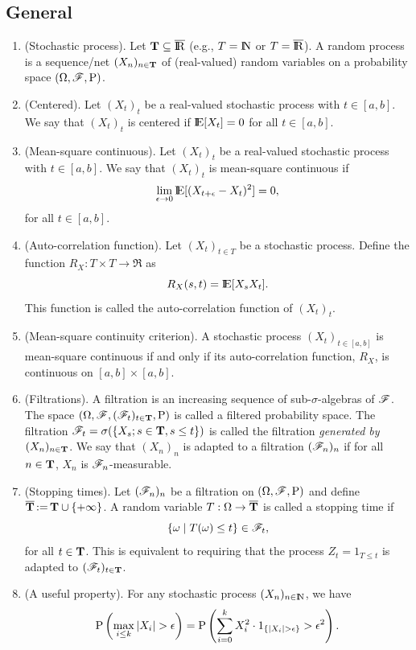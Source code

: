 \documentclass[a4paper,10pt]{article}
\begin{document}
\subsection{General}
\begin{enumerate}
 \item (Stochastic process). Let $\T \subseteq \barre$ (e.g., $T=\N$ or $T=\barre$). A random process is 
       a sequence/net $(X_n)_{n\in \mathbf{T}}$ of (real-valued) random variables on a probability space $(\Omega,\mathscr{F},\mathrm{P})$.
       
 \item (Centered). Let \((X_t)_t\) be a real-valued stochastic process with \(t\in[a,b]\).
       We say that \((X_t)_t\) is centered if \(\E[X_t]=0\) for all \(t\in[a,b]\).
       
 \item (Mean-square continuous). Let \((X_t)_t\) be a real-valued stochastic process with \(t\in[a,b]\).
       We say that \((X_t)_t\) is mean-square continuous if 
       \[
        \lim_{\epsilon \to 0}\E[(X_{t+\epsilon}-X_t)^2]=0,
       \]
       for all \(t\in[a,b]\).

 \item (Auto-correlation function). Let \((X_t)_{t\in T}\) be a stochastic process. Define 
       the function \(R_X:T\times T\to \Re\) as 
       \[
        R_X(s,t) = \E[X_s X_t].
       \]
       This function is called the auto-correlation function of \((X_t)_t\).
       
 \item (Mean-square continuity criterion). A stochastic process \((X_t)_{t\in[a,b]}\) is
       mean-square continuous if and only if its auto-correlation function, \(R_X\), is 
       continuous on \([a,b]\times [a,b]\).
       
 \item (Filtrations). A filtration is an increasing sequence of sub-$\sigma$-algebras of $\mathscr{F}$. The space 
       $(\Omega, \mathscr{F}, (\mathscr{F}_t)_{t\in \mathbf{T}}, \mathrm{P})$ is called a filtered probability space. The filtration 
       $\mathscr{F}_t = \sigma(\{X_s; s\in \mathbf{T}, s\leq t\})$ is called the filtration \textit{generated by $(X_n)_{n\in \mathbf{T}}$}.
       We say that $(X_n)_n$ is adapted to a filtration $(\mathscr{F}_n)_n$ if for all $n\in \mathbf{T}$, $X_n$ is $\mathscr{F}_n$-measurable.
       
 \item (Stopping times). Let $(\mathscr{F}_n)_n$ be a filtration on $(\Omega,\mathscr{F},\mathrm{P})$ and define $\overline{\mathbf{T}} {}\mathop{\mathrel{:}=}{} \mathbf{T} \cup \{+\infty\}$.
       A random variable $T: \Omega \to \overline{\mathbf{T}}$ is called a stopping time if
       \[
        \{\omega {}\mid{} T(\omega) \leq t\} \in \mathscr{F}_t,
       \]
      for all $t\in \mathbf{T}$. This is equivalent to requiring that the process $Z_t = 1_{T \leq t}$ is adapted to $(\mathscr{F}_t)_{t\in \mathbf{T}}$.
      
 \item (A useful property). For any stochastic process $(X_n)_{n\in\N}$, we have
 \[
  \prob\left(\max_{i\leq k}|X_i|>\epsilon\right) = \prob\left(\sum_{i=0}^{k}X_i^2 \cdot  1_{\{|X_i|>\epsilon\}}>\epsilon^2\right).
 \]

\end{enumerate}
\end{document}
